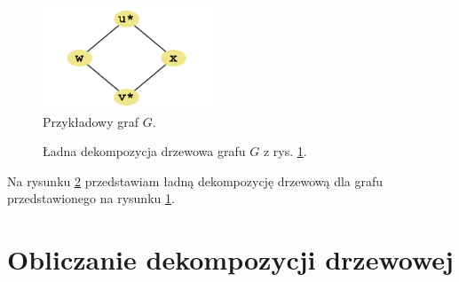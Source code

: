 \documentclass[12pt, oneside]{report}
\begin{document}
\begin{figure}
\centering
\label{kwadrat}
\includegraphics[width=5cm]{square_steiner_tree_standard_graph.png}
\caption{Przykładowy graf $G$.}
\end{figure}

\begin{figure}
\centering
\label{dekompozycja_kwadratu}
\caption{Ładna dekompozycja drzewowa grafu $G$ z rys. \ref{kwadrat}.}
\end{figure}

Na rysunku \ref{dekompozycja_kwadratu} przedstawiam ładną dekompozycję drzewową dla grafu przedstawionego na rysunku \ref{kwadrat}.

		\section{Obliczanie dekompozycji drzewowej}
\end{document}
